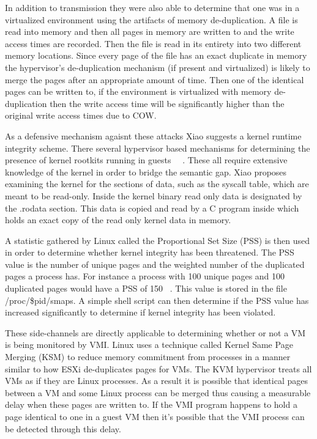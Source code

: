 In addition to transmission they were also able to determine that one was in a virtualized environment using the artifacts of memory de-duplication. A file is read into memory and then all pages in memory are written to and the write access times are recorded. Then the file is read in its entirety into two different memory locations. Since every page of the file has an exact duplicate in memory the hypervisor’s de-duplication mechanism (if present and virtualized) is likely to merge the pages after an appropriate amount of time. Then one of the identical pages can be written to, if the environment is virtualized with memory de-duplication then the write access time will be significantly higher than the original write access times due to COW. 



As a defensive mechanism agaisnt these attacks Xiao suggests a kernel runtime integrity scheme.  There several hypervisor based mechanisms for determining the presence of kernel rootkits running in guests ~\cite{butler_windows_2005}~\cite{hoglund_*real*_1999}. These all require extensive knowledge of the kernel in order to bridge the semantic gap. Xiao proposes examining the kernel for the sections of data, such as the syscall table, which are meant to be read-only. Inside the kernel binary read only data is designated by the .rodata section. This data is copied and read by a C program inside which holds an exact copy of the read only kernel data in memory. 

A statistic gathered by Linux called the Proportional Set Size (PSS) is then used in order to determine whether kernel integrity has been threatened. The PSS value is the number of unique pages and the weighted number of the duplicated pages a process has. For instance a process with 100 unique pages and 100 duplicated pages would have a PSS of 150 ~\cite{xiao_security_2013}. This value is stored in the file /proc/\$pid/smaps. A simple shell script can then determine if the PSS value has increased significantly to determine if kernel integrity has been violated. 

These side-channels are directly applicable to determining whether or not a VM is being monitored by VMI. Linux uses a technique called Kernel Same Page Merging (KSM) to reduce memory commitment from processes in a manner similar to how ESXi de-duplicates pages for VMs. The KVM hypervisor treats all VMs as if they are Linux processes. As a result it is possible that identical pages between a VM and some Linux process can be merged thus causing a measurable delay when these pages are written to. If the VMI program happens to hold a page identical to one in a guest VM then it's possible that the VMI process can be detected through this delay. 

